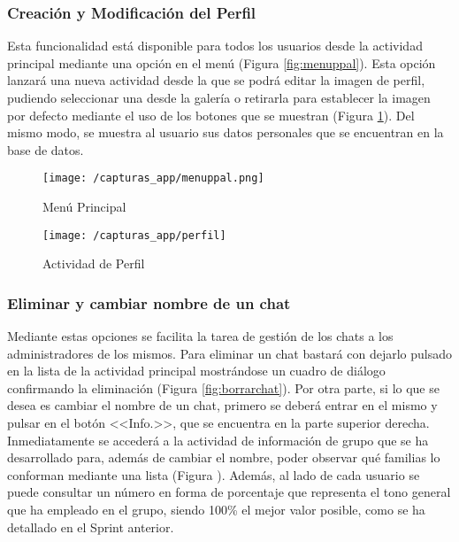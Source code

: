 \clearpage

\subsubsection{Creación y Modificación del Perfil}
Esta funcionalidad está disponible para todos los usuarios desde la actividad principal mediante una opción en el menú (Figura \ref{fig:menuppal}). Esta opción lanzará una nueva actividad desde la que se podrá editar la imagen de perfil, pudiendo seleccionar una desde la galería o retirarla para establecer la imagen por defecto mediante el uso de los botones que se muestran (Figura \ref{fig:perfil}). Del mismo modo, se muestra al usuario sus datos personales que se encuentran en la base de datos.

\begin{figure}[!h]
	\centering
	\begin{minipage}{.5\textwidth}
		\centering
		\texttt{[image: /capturas\_app/menuppal.png]}
		\caption{Menú Principal}
		\label{fig:menuppal}
	\end{minipage}%
	\begin{minipage}{.5\textwidth}
		\centering
		\texttt{[image: /capturas\_app/perfil]}
		\caption{Actividad de Perfil}
		\label{fig:perfil}
	\end{minipage}
\end{figure}

\clearpage

\subsubsection{Eliminar y cambiar nombre de un chat}
Mediante estas opciones se facilita la tarea de gestión de los chats a los administradores de los mismos. Para eliminar un chat bastará con dejarlo pulsado en la lista de la actividad principal mostrándose un cuadro de diálogo confirmando la eliminación (Figura \ref{fig:borrarchat}). Por otra parte, si lo que se desea es cambiar el nombre de un chat, primero se deberá entrar en el mismo y pulsar en el botón <<Info.>>, que se encuentra en la parte superior derecha. Inmediatamente se accederá a la actividad de información de grupo que se ha desarrollado para, además de cambiar el nombre, poder observar qué familias lo conforman mediante una lista (Figura ). Además, al lado de cada usuario se puede consultar un número en forma de porcentaje que representa el tono general que ha empleado en el grupo, siendo 100\% el mejor valor posible, como se ha detallado en el Sprint anterior.

